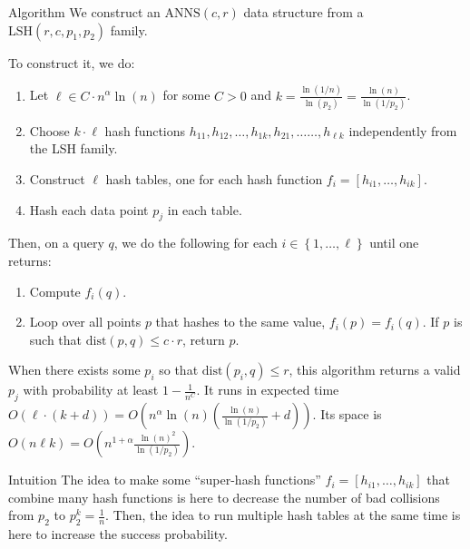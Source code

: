 \documentclass[a4paper]{article}
\begin{document}
\begin{parag}{Algorithm}
    We construct an $\text{ANNS}\left(c, r\right)$ data structure from a $\text{LSH}\left(r, c, p_1, p_2\right)$ family.

    To construct it, we do:
    \begin{enumerate}
        \item Let $\ell \in C\cdot n^{\alpha} \ln\left(n\right)$ for some $C > 0$ and $k = \frac{\ln\left(1/n\right)}{\ln\left(p_2\right)} = \frac{\ln\left(n\right)}{\ln\left(1 / p_2\right)}$.
        \item Choose $k\cdot \ell$ hash functions $h_{11}, h_{12}, \ldots, h_{1k}, h_{21}, \ldots \ldots, h_{\ell k}$ independently from the LSH family. 
        \item Construct $\ell$ hash tables, one for each hash function $f_i = \left[h_{i1}, \ldots, h_{ik}\right]$.
        \item Hash each data point $p_j$ in each table.
    \end{enumerate}

    Then, on a query $q$, we do the following for each $i \in \left\{1, \ldots, \ell\right\}$ until one returns:
    \begin{enumerate}
        \item Compute $f_i\left(q\right)$.
        \item Loop over all points $p$ that hashes to the same value, $f_i\left(p\right) = f_i\left(q\right)$. If $p$ is such that $\text{dist}\left(p, q\right) \leq c\cdot r$, return $p$.
    \end{enumerate}

    When there exists some $p_i$ so that $\text{dist}\left(p_i, q\right) \leq r$, this algorithm returns a valid $p_j$ with probability at least $1 - \frac{1}{n^C}$. It runs in expected time $O\left(\ell\cdot \left(k + d\right)\right) = O\left(n^{\alpha} \ln\left(n\right) \left(\frac{\ln\left(n\right)}{\ln\left(1/p_2\right)} + d\right)\right)$. Its space is $O\left(n \ell k\right) = O\left(n^{1 + \alpha} \frac{\ln\left(n\right)^2}{\ln\left(1/p_2\right)}\right)$. 

    \begin{subparag}{Intuition}
        The idea to make some ``super-hash functions'' $f_i = \left[h_{i1}, \ldots, h_{ik}\right]$ that combine many hash functions is here to decrease the number of bad collisions from $p_2$ to $p_2^k = \frac{1}{n}$. Then, the idea to run multiple hash tables at the same time is here to increase the success probability.


\end{subparag}
\end{parag}
\end{document}
